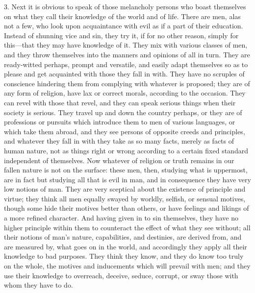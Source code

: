 3. Next it is obvious to speak of those melancholy persons who
boast themselves on what they call their knowledge of the world and of
life. There are men, alas not a few, who look upon acquaintance with
evil as if a part of their education. Instead of shunning vice and
sin, they try it, if for no other reason, simply for this—that they
may have knowledge of it. They mix with various classes of men, and
they throw themselves into the manners and opinions of all in turn.
They are ready-witted perhaps, prompt and versatile, and easily adapt
themselves so as to please and get acquainted with those they fall in
with. They have no scruples of conscience hindering them from
complying with whatever is proposed; they are of any form of religion,
have lax or correct morals, according to the occasion. They can revel
with those that revel, and they can speak serious things when their
society is serious. They travel up and down the country perhaps, or
they are of professions or pursuits which introduce them to men of
various languages, or which take them abroad, and they see persons of
opposite creeds and principles, and whatever they fall in with they
take as so many facts, merely as facts of human nature, not as things
right or wrong according to a certain fixed standard independent of
themselves. Now whatever of religion or truth remains in our fallen
nature is not on the surface: these men, then, studying what is
uppermost, are in fact but studying all that is evil in man, and in
consequence they have very low notions of man. They are very sceptical
about the existence of principle and virtue; they think all men
equally swayed by worldly, selfish, or sensual motives, though some
hide their motives better than others, or have feelings and likings of
a more refined character. And having given in to sin themselves, they
have no higher principle within them to counteract the effect of what
they see without; all their notions of man's nature, capabilities, and
destinies, are derived from, and are measured by, what goes on in the
world, and accordingly they apply all their knowledge to bad purposes.
They think they know, and they do know too truly on the whole, the
motives and inducements which will prevail with men; and they use
their knowledge to overreach, deceive, seduce, corrupt, or sway those
with whom they have to do.

